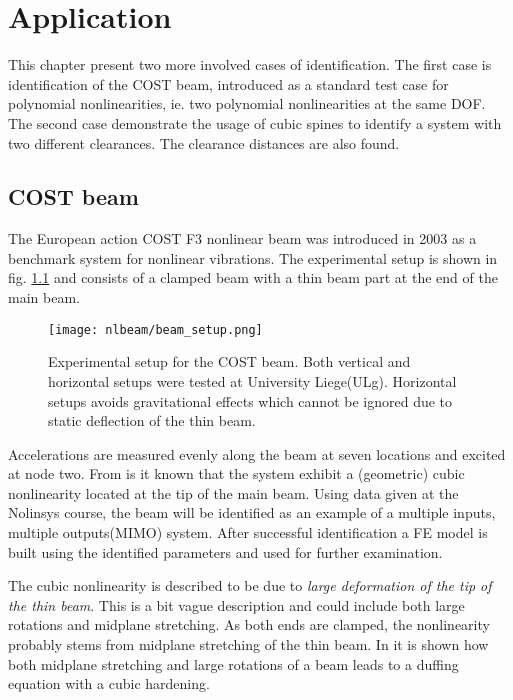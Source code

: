 
\chapter{Application}
\label{cha:application}

This chapter present two more involved cases of identification. The first case
is identification of the COST beam, introduced as a standard test case for
polynomial nonlinearities, ie. two polynomial nonlinearities at the same DOF.
The second case demonstrate the usage of cubic spines to identify a system with
two different clearances. The clearance distances are also found.


\section{COST beam}
\label{sec:cost-beam}

The European action COST F3 nonlinear beam \autocite{GOLINVAL2003} was
introduced in 2003 as a benchmark system for nonlinear vibrations. The
experimental setup is shown in fig. \ref{fig:beam_setup} and consists of a
clamped beam with a thin beam part at the end of the main beam.

\begin{figure}[!ht]
  \centering
  \texttt{[image: nlbeam/beam\_setup.png]}
  \caption{Experimental setup for the COST beam. Both vertical and horizontal
    setups were tested at University Liege(ULg). Horizontal setups avoids
    gravitational effects which cannot be ignored due to static deflection of
    the thin beam.}
  \label{fig:beam_setup}
\end{figure}


Accelerations are measured evenly along the beam at seven locations and excited
at node two.
From \textcite{lenaerts2003a} is it known that the system exhibit a (geometric)
cubic nonlinearity located at the tip of the main beam. Using data given at the
Nolinsys course, the beam will be identified as an example of a multiple inputs,
multiple outputs(MIMO) system. After successful identification a FE model is
built using the identified parameters and used for further examination.

The cubic nonlinearity is described to be due to \textit{large deformation of the
  tip of the thin beam}. This is a bit vague description and could include both
large rotations and midplane stretching. As both ends are clamped, the
nonlinearity probably stems from midplane stretching of the thin beam.
In \autocite{juel2003a} it is shown how both midplane stretching and large
rotations of a beam leads to a duffing equation with a cubic hardening.

